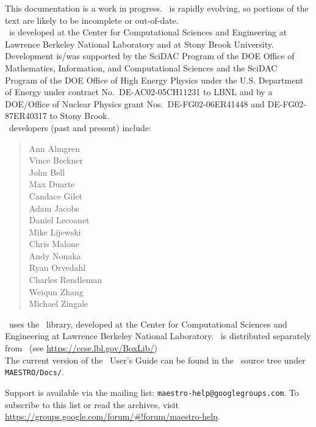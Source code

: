 This documentation is a work in progress.  \maestro\ is rapidly
evolving, so portions of the text are likely to be incomplete or
out-of-date. \\

\noindent \maestro\ is developed at the Center for Computational Sciences and
Engineering at Lawrence Berkeley National Laboratory and at Stony
Brook University.  Development is/was supported by the SciDAC Program of
the DOE Office of Mathematics, Information, and Computational Sciences
and the SciDAC Program of the DOE Office of High Energy Physics under
the U.S. Department of Energy under contract No.\ DE-AC02-05CH11231 to
LBNL and by a DOE/Office of Nuclear Physics grant Nos.\
DE-FG02-06ER41448 and DE-FG02-87ER40317 to Stony Brook.  \\

\noindent \maestro\ developers (past and present) include: 
\begin{quote}
Ann Almgren \\
Vince Beckner \\
John Bell \\
Max Duarte \\
Candace Gilet \\
Adam Jacobs \\
Daniel Lecoanet \\
Mike Lijewski \\
Chris Malone \\
Andy Nonaka \\
Ryan Orvedahl \\
Charles Rendleman \\
Weiqun Zhang \\
Michael Zingale
\end{quote}

\noindent \maestro\ uses the \boxlib\ library,
developed at the Center for Computational Sciences and Engineering at
Lawrence Berkeley National Laboratory.  \boxlib\ is distributed
separately from \maestro\ (see
\url{https://ccse.lbl.gov/BoxLib/})
\\

\noindent The current version of the \maestro\ User's Guide can be found in 
the \maestro\ source tree under {\tt MAESTRO/Docs/}.


\noindent Support is available via the mailing list: {\tt maestro-help@googlegroups.com}.  To subscribe to this list or read the archives, visit
\url{https://groups.google.com/forum/#!forum/maestro-help}.
